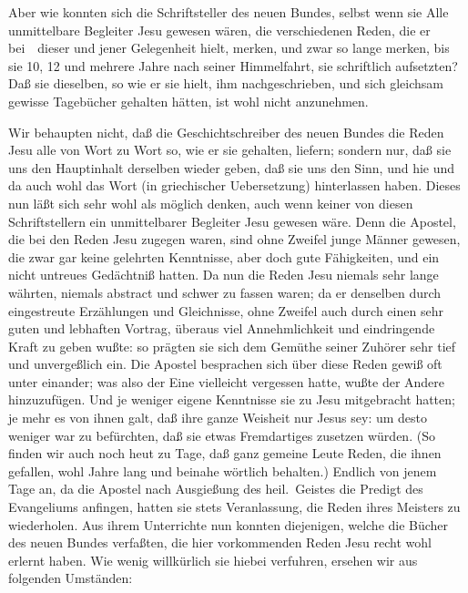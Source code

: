  Aber wie konnten sich die Schriftsteller des neuen Bundes, selbst wenn sie Alle unmittelbare Begleiter Jesu gewesen wären, die verschiedenen Reden, die er bei~\ dieser und jener Gelegenheit hielt, merken, und zwar so lange merken, bis sie 10, 12 und mehrere Jahre nach seiner Himmelfahrt, sie schriftlich aufsetzten? Daß sie dieselben, so wie er sie hielt, ihm nachgeschrieben, und sich gleichsam gewisse Tagebücher gehalten hätten, ist wohl nicht anzunehmen.\par
{} Wir behaupten nicht, daß die Geschichtschreiber des neuen Bundes die Reden Jesu alle von Wort zu Wort so, wie er sie gehalten, liefern; sondern nur, daß sie uns den Hauptinhalt derselben wieder geben, daß sie uns den Sinn, und hie und da auch wohl das Wort (in griechischer Uebersetzung) hinterlassen haben. Dieses nun läßt sich sehr wohl als möglich denken, auch wenn keiner von diesen Schriftstellern ein unmittelbarer Begleiter Jesu gewesen wäre. Denn die Apostel, die bei den Reden Jesu zugegen waren, sind ohne Zweifel junge Männer gewesen, die zwar gar keine gelehrten Kenntnisse, aber doch gute Fähigkeiten, und ein nicht untreues Gedächtniß hatten. Da nun die Reden Jesu niemals sehr lange währten, niemals abstract und schwer zu fassen waren; da er denselben durch eingestreute Erzählungen und Gleichnisse, ohne Zweifel auch durch einen sehr guten und lebhaften Vortrag, überaus viel Annehmlichkeit und eindringende Kraft zu geben wußte: so prägten sie sich dem Gemüthe seiner Zuhörer sehr tief und unvergeßlich ein. Die Apostel besprachen sich über diese Reden gewiß oft unter einander; was also der Eine vielleicht vergessen hatte, wußte der Andere hinzuzufügen. Und je weniger eigene Kenntnisse sie zu Jesu mitgebracht hatten; je mehr es von ihnen galt, daß ihre ganze Weisheit nur Jesus sey: um desto weniger war zu befürchten, daß sie etwas Fremdartiges zusetzen würden. (So finden wir auch noch heut zu Tage, daß ganz gemeine Leute Reden, die ihnen gefallen, wohl Jahre lang und beinahe wörtlich behalten.) Endlich von jenem Tage an, da die Apostel nach Ausgießung des heil.\ Geistes die Predigt des Evangeliums anfingen, hatten sie stets Veranlassung, die Reden ihres Meisters zu wiederholen. Aus ihrem Unterrichte nun konnten diejenigen, welche die Bücher des neuen Bundes verfaßten, die hier vorkommenden Reden Jesu recht wohl erlernt haben. Wie wenig willkürlich sie hiebei verfuhren, ersehen wir aus folgenden Umständen:~ 
